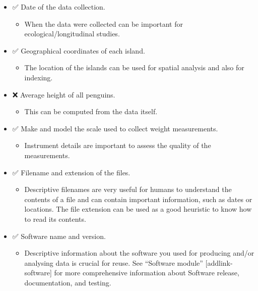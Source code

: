 \documentclass[
  letterpaper,
  DIV=11,
  numbers=noendperiod]{scrreport}
\providecommand{\tightlist}{%
  \setlength{\itemsep}{0pt}\setlength{\parskip}{0pt}}\usepackage{longtable,booktabs,array}
\begin{document}
\begin{itemize}
\tightlist
\item
  ✅ Date of the data collection.

  \begin{itemize}
  \tightlist
  \item
    When the data were collected can be important for
    ecological/longitudinal studies.
  \end{itemize}
\item
  ✅ Geographical coordinates of each island.

  \begin{itemize}
  \tightlist
  \item
    The location of the islands can be used for spatial analysis and
    also for indexing.
  \end{itemize}
\item
  ❌ Average height of all penguins.

  \begin{itemize}
  \tightlist
  \item
    This can be computed from the data itself.
  \end{itemize}
\item
  ✅ Make and model the scale used to collect weight measurements.

  \begin{itemize}
  \tightlist
  \item
    Instrument details are important to assess the quality of the
    measurements.
  \end{itemize}
\item
  ✅ Filename and extension of the files.

  \begin{itemize}
  \tightlist
  \item
    Descriptive filenames are very useful for humans to understand the
    contents of a file and can contain important information, such as
    dates or locations. The file extension can be used as a good
    heuristic to know how to read its contents.
  \end{itemize}
\item
  ✅ Software name and version.

  \begin{itemize}
  \tightlist
  \item
    Descriptive information about the software you used for producing
    and/or analysing data is crucial for reuse. See ``Software module''
    {[}addlink-software{]} for more comprehensive information about
    Software release, documentation, and testing.
  \end{itemize}
\end{itemize}
\end{document}
